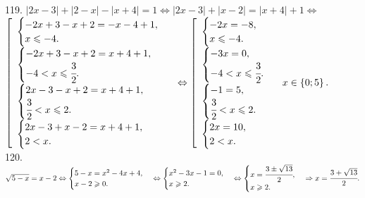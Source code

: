\documentclass[12pt]{article}
\begin{document}
119. $|2x-3|+|2-x|-|x+4|=1\Leftrightarrow |2x-3|+|x-2|=|x+4|+1\Leftrightarrow$\\$ \left[\begin{array}{l}\begin{cases} -2x+3-x+2=-x-4+1,\\ x\leqslant-4.\end{cases}\\
\begin{cases} -2x+3-x+2=x+4+1,\\ -4<x\leqslant\cfrac{3}{2}.\end{cases}\\ \begin{cases} 2x-3-x+2=x+4+1,\\ \cfrac{3}{2}<x\leqslant2.\end{cases}\\
\begin{cases} 2x-3+x-2=x+4+1,\\ 2< x.\end{cases}\end{array}\right.\Leftrightarrow \left[\begin{array}{l}\begin{cases} -2x=-8,\\ x\leqslant-4.\end{cases}\\
\begin{cases} -3x=0,\\ -4<x\leqslant\cfrac{3}{2}.\end{cases}\\ \begin{cases} -1=5,\\ \cfrac{3}{2}<x\leqslant2.\end{cases}\\
\begin{cases} 2x=10,\\ 2< x.\end{cases}\end{array}\right.
x\in\left\{0;5\right\}.$\\
120. $\sqrt{5-x}=x-2\Leftrightarrow\begin{cases} 5-x=x^2-4x+4,\\ x-2\geqslant0.\end{cases}\Leftrightarrow\begin{cases} x^2-3x-1=0,\\ x\geqslant2.\end{cases}\Leftrightarrow\begin{cases} x=\cfrac{3\pm\sqrt{13}}{2},\\ x\geqslant2.\end{cases}\Rightarrow x=\cfrac{3+\sqrt{13}}{2}.$\\
\end{document}
